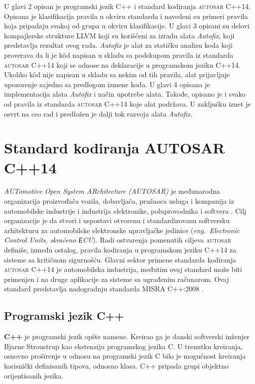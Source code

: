 \documentclass[12pt,oneside]{memoir}
\begin{document}
U glavi 2 opisan je programski jezik C++ i standard kodiranja \textsc{autosar} C++14. Opisana je klasifikacija pravila u okviru standarda i navedeni su primeri pravila koja pripadaju svakoj od grupa u okviru klasifikacije. U glavi 3 opisani su delovi kompajlerske strukture LLVM koji su kori\v{s}\'{c}eni za izradu alata \textit{Autofix}, koji predstavlja rezultat ovog rada. \textit{Autofix} je alat za stati\v{c}ku analizu koda koji proverava da li je k\^{o}d napisan u skladu sa podskupom pravila iz standarda \textsc{autosar} C++14 koji se odnose na deklaracije u programskom jeziku C++14. Ukoliko k\^{o}d nije napisan u skladu sa nekim od tih pravila, alat prijavljuje upozorenje zajedno sa predlogom izmene koda. U glavi 4 opisana je implementacija alata \textit{Autofix} i na\v{c}in upotrebe alata. Takođe, opisano je i svako od pravila iz standarda \textsc{autosar} C++14 koje alat podr\v{z}ava. U zaklju\v{c}ku iznet je osvrt na ceo rad i predlo\v{z}en je dalji tok razvoja alata \textit{Autofix}.
\chapter{Standard kodiranja \textsc{AUTOSAR} C++14}
\label{chp:autosar}

\textit{AUTomotive Open System ARchitecture (\textsc{AUTOSAR})} je međunarodna organizacija proizvođača vozila, dobavljača, pružaoca usluga i kompanija iz automobilske industrije i industrija elektronike, poluprovodnika i softvera \cite{autosarWebsite}. 
Cilj organizacije je da stvori i uspostavi otvorenu i standardizovanu softversku arhitekturu za automobilske elektronske upravljačke jedinice (\textit{eng.~Electronic Control Units, skra\'{c}eno ЕCU}).
Radi ostvarenja pomenutih ciljeva \textsc{autosar} definiše, između ostalog, pravila kodiranja u programskom jeziku C++14 za sisteme sa kriti\v{c}nom sigurno\v{s}\'{c}u. Glavni sektor primene standarda kodiranja \textsc{autosar} C++14 je automobilska industrija, međutim ovaj standard može biti primenjen
i na druge aplikacije za sisteme sa ugrađenim računarom. Ovaj standard predstavlja nadogradnju standarda MISRA C++:2008 \cite{AutosarGuidelines}.

\section{Programski jezik C++}

\textbf{C++} je programski jezik op\v{s}te namene. Kreirao ga je danski softverski in\v{z}enjer Bjarne Stroustrup kao ekstenziju programskog jezika C. U trenutku kreiranja, osnovno pro\v{s}irenje u odnosu na programski jezik C bilo je mogu\'{c}nost kreiranja korisni\v{c}ki definisanih tipova, odnosno klasa. C++ pripada grupi objektno orijentisanih jezika. 
\end{document}
